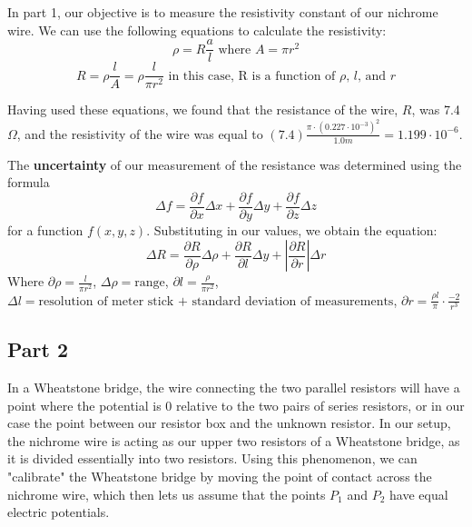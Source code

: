 \documentclass[titlepage]{article}
\begin{document}
    In part 1, our objective is to measure the resistivity constant of our nichrome wire. We can use the following equations to calculate the resistivity:
    $$\rho = R \frac{a}{l} \text{ where } A=\pi r^2$$ 
    $$ R=\rho \frac{l}{A} = \rho \frac{l}{\pi r^2}  \text{ in this case, R is a function of $\rho$, $l$, and $r$} $$

    Having used these equations, we found that the resistance of the wire, $R$, was 7.4$\Omega$, and the resistivity of the wire was equal to $(7.4)\frac{\pi \cdot (0.227 \cdot 10^{-3})^2}{1.0m} = 1.199\cdot 10^{-6}$. 

    The \textbf{uncertainty} of our measurement of the resistance was determined using the formula $$\Delta f= \frac{\partial f}{\partial x} \Delta x + \frac{\partial f}{\partial y} \Delta y + \frac{\partial f}{\partial z} \Delta z$$ for a function $f(x,y,z)$.
    Substituting in our values, we obtain the equation:
    $$\Delta R= \frac{\partial R}{\partial \rho} \Delta \rho + \frac{\partial R}{\partial l} \Delta y + \left|\frac{\partial R}{\partial r}\right| \Delta r$$ 
    Where $\partial \rho = \frac{l}{\pi r^2}$, $\Delta \rho = \text{range}$, $\partial l = \frac{\rho}{\pi r^2}$, $\Delta l =\text{resolution of meter stick + standard deviation of measurements}$, $\partial r = \frac{\rho l}{\pi}\cdot \frac{-2}{r^3}$ 
    
    


        \subsection{Part 2} 
        In a Wheatstone bridge, the wire connecting the two parallel resistors will have a point where the potential is 0 relative to the two pairs of series resistors, or in our case the point between our resistor box and the unknown resistor. In our setup, the nichrome wire is acting as our upper two resistors of a Wheatstone bridge, as it is divided essentially into two resistors. Using this phenomenon, we can "calibrate" the Wheatstone bridge by moving the point of contact across the nichrome wire, which then lets us assume that the points $P_1$ and $P_2$ have equal electric potentials. 
\end{document}
